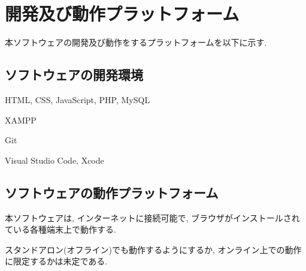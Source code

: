 \documentclass[11ptm]{jsarticle}
\begin{document}
\newpage
\section{開発及び動作プラットフォーム}
\label{sec:開発及び動作プラットフォーム}
本ソフトウェアの開発及び動作をするプラットフォームを以下に示す.

\subsection{ソフトウェアの開発環境}
\label{subsec:ソフトウェアの開発環境}
\begin{description}[labelwidth=9em]
  \item[使用言語] HTML, CSS, JavaScript, PHP, MySQL
  \item[使用フレームワーク] XAMPP
  \item[使用ミドルウェア] Git
  \item[使用開発環境] Visual Studio Code, Xcode
\end{description}

\subsection{ソフトウェアの動作プラットフォーム}
\label{subsec:ソフトウェアの動作プラットフォーム}
本ソフトウェアは, インターネットに接続可能で, ブラウザがインストールされている各種端末上で動作する. \par
スタンドアロン(オフライン)でも動作するようにするか, オンライン上での動作に限定するかは未定である.


\newpage
\end{document}
